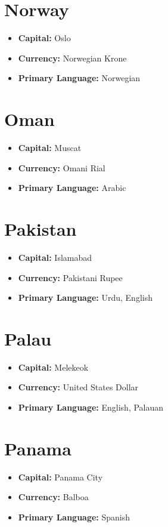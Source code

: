 \documentclass[a4paper,100pt,twoside]{book}
\begin{document}
\section*{\Huge Norway}
\vspace{5mm} %
\begin{itemize}
	\item \textbf{Capital:} Oslo
	\item \textbf{Currency:} Norwegian Krone
	\item \textbf{Primary Language:} Norwegian
\end{itemize}

\section*{\Huge Oman}
\vspace{5mm} %
\begin{itemize}
	\item \textbf{Capital:} Muscat
	\item \textbf{Currency:} Omani Rial
	\item \textbf{Primary Language:} Arabic
\end{itemize}

\section*{\Huge Pakistan}
\vspace{5mm} %
\begin{itemize}
	\item \textbf{Capital:} Islamabad
	\item \textbf{Currency:} Pakistani Rupee
	\item \textbf{Primary Language:} Urdu, English
\end{itemize}

\section*{\Huge Palau}
\vspace{5mm} %
\begin{itemize}
	\item \textbf{Capital:} Melekeok
	\item \textbf{Currency:} United States Dollar
	\item \textbf{Primary Language:} English, Palauan
\end{itemize}

\section*{\Huge Panama}
\vspace{5mm} %
\begin{itemize}
	\item \textbf{Capital:} Panama City
	\item \textbf{Currency:} Balboa
	\item \textbf{Primary Language:} Spanish
\end{itemize}
\end{document}
